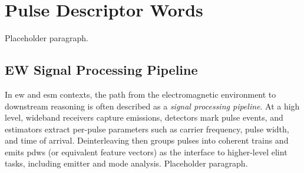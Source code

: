 \section{Pulse Descriptor Words}\label{sec:bg:pdw}

Placeholder paragraph.

\subsection{EW Signal Processing Pipeline}\label{sec:bg:ew_pipeline}

In \gls{ew} and \gls{esm} contexts, the path from the electromagnetic environment to downstream reasoning is often described as a \emph{signal processing pipeline}.
At a high level, wideband receivers capture emissions, detectors mark pulse events, and estimators extract per-pulse parameters such as carrier frequency, pulse width, and time of arrival.
Deinterleaving then groups pulses into coherent trains and emits \glspl{pdw} (or equivalent feature vectors) as the interface to higher-level \gls{elint} tasks, including emitter and mode analysis.
Placeholder paragraph.
